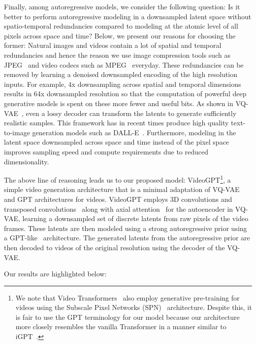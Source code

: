 \documentclass{article}
\begin{document}
Finally, among autoregressive models, we consider the following question: Is it better to perform autoregressive modeling in a downsampled latent space without spatio-temporal redundancies compared to modeling at the atomic level of all pixels across space and time? Below, we present our reasons for choosing the former: Natural images and videos contain a lot of spatial and temporal redundancies and hence the reason we use image compression tools such as JPEG~\citep{wallace1992jpeg} and video codecs such as MPEG~\citep{le1991mpeg} everyday. These redundancies can be removed by learning a denoised downsampled encoding of the high resolution inputs. For example, 4x downsampling across spatial and temporal dimensions results in 64x downsampled resolution so that the computation of powerful deep generative models is spent on these more fewer and useful bits. As shown in VQ-VAE~\citep{van2017neural}, even a lossy decoder can transform the latents to generate sufficiently realistic samples. This framework has in recent times produce high quality text-to-image generation models such as DALL-E~\cite{ramesh2021zero}. Furthermore, modeling in the latent space downsampled across space and time instead of the pixel space improves sampling speed and compute requirements due to reduced dimensionality. 


The above line of reasoning leads us to our proposed model: VideoGPT\footnote{We note that Video Transformers~\cite{weissenborn2019scaling} also employ generative pre-training for videos using the Subscale Pixel Networks (SPN)~\cite{menick2018generating} architecture. Despite this, it is fair to use the GPT terminology for our model because our architecture more closely resembles the vanilla Transformer in a manner similar to iGPT~\cite{chen2020generative}.}, a simple video generation architecture that is a minimal adaptation of VQ-VAE and GPT architectures for videos. VideoGPT employs 3D convolutions and transposed convolutions~\citep{tran2015learning} along with axial attention~\citep{clark2019adversarial, ho2019axial} for the autoencoder in VQ-VAE, learning a downsampled set of discrete latents from raw pixels of the video frames. These latents are then modeled using a strong autoregressive prior using a GPT-like~\citep{radford2019language, child2019generating, chen2020generative} architecture. The generated latents from the autoregressive prior are then decoded to videos of the original resolution using the decoder of the VQ-VAE.

Our results are highlighted below:
\end{document}
